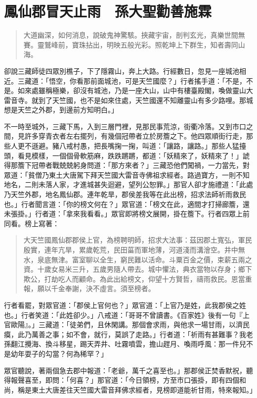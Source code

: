 
\chapter{鳳仙郡冒天止雨　孫大聖勸善施霖}

\begin{quote}
大道幽深，如何消息，說破鬼神驚駭。挾藏宇宙，剖判玄光，真樂世間無賽。靈鷲峰前，寶珠拈出，明映五般光彩。照乾坤上下群生，知者壽同山海。
\end{quote}

卻說三藏師徒四眾別樵子，下了隱霧山，奔上大路。行經數日，忽見一座城池相近。三藏道：「悟空，你看那前面城池，可是天竺國麼？」行者搖手道：「不是，不是。如來處雖稱極樂，卻沒有城池，乃是一座大山，山中有樓臺殿閣，喚做靈山大雷音寺。就到了天竺國，也不是如來住處，天竺國還不知離靈山有多少路哩。那城想是天竺之外郡，到邊前方知明白。」

不一時至城外，三藏下馬，入到三層門裡，見那民事荒涼，街衢冷落。又到市口之間，見許多穿青衣者左右擺列，有幾個冠帶者立於房簷之下。他四眾順街行走，那些人更不遜避。豬八戒村愚，把長嘴掬一掬，叫道：「讓路，讓路。」那些人猛擡頭，看見模樣，一個個骨軟筋麻，跌跌蹡蹡，都道：「妖精來了，妖精來了！」諕得那簷下冠帶者戰兢兢躬身問道：「那方來者？」三藏恐他們闖禍，一力當先，對眾道：「貧僧乃東土大唐駕下拜天竺國大雷音寺佛祖求經者。路過寶方，一則不知地名，二則未落人家，才進城甚失迴避，望列公恕罪。」那官人卻才施禮道：「此處乃天竺外郡，地名鳳仙郡。連年乾旱，郡侯差我等在此出榜，招求法師祈雨救民也。」行者聞言道：「你的榜文何在？」眾官道：「榜文在此，適間才打掃廊簷，還未張掛。」行者道：「拿來我看看。」眾官即將榜文展開，掛在簷下。行者四眾上前同看。榜上寫著：
\begin{quote}
大天竺國鳳仙郡郡侯上官，為榜聘明師，招求大法事：茲因郡土寬弘，軍民殷實，連年亢旱，累歲乾荒，民田菑而軍地薄，河道淺而溝澮空。井中無水，泉底無津。富室聊以全生，窮民難以活命。斗粟百金之價，束薪五兩之資。十歲女易米三升，五歲男隨人帶去。城中懼法，典衣當物以存身；鄉下欺公，打劫吃人而顧命。為此出給榜文，仰望十方賢哲，禱雨救民。恩當重報，願以千金奉謝，決不虛言。須至榜者。
\end{quote}

行者看罷，對眾官道：「郡侯上官何也？」眾官道：「上官乃是姓，此我郡侯之姓也。」行者笑道：「此姓卻少。」八戒道：「哥哥不曾讀書。《百家姓》後有一句『上官歐陽』。」三藏道：「徒弟們，且休閑講。那個會求雨，與他求一場甘雨，以濟民瘼，此乃萬善之事；如不會，就行，莫誤了走路。」行者道：「祈雨有甚難事？我老孫翻江攪海、換斗移星，踢天弄井、吐霧噴雲，擔山趕月、喚雨呼風：那一件兒不是幼年耍子的勾當？何為稀罕？」

眾官聽說，著兩個急去郡中報道：「老爺，萬千之喜至也。」那郡侯正焚香默祝，聽得報聲喜至，即問：「何喜？」那官道：「今日領榜，方至市口張掛，即有四個和尚，稱是東土大唐差往天竺國大雷音拜佛求經者，見榜即道能祈甘雨，特來報知。」

